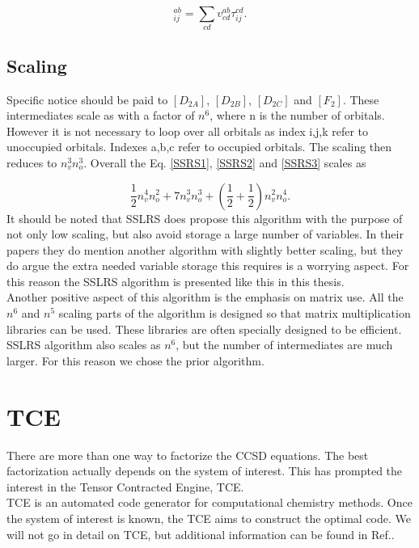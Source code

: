 \begin{equation}
[F_2]_{ij}^{ab} = \sum_{cd} v_{cd}^{ab} \tau_{ij}^{cd} .
\end{equation}

\subsection{Scaling}
Specific notice should be paid to $[D_{2A}]$, $[D_{2B}]$, $[D_{2C}]$ and $[F_{2}]$. These intermediates scale as with a factor of $n^6$, where n is the number of orbitals. However it is not necessary to loop over all orbitals as index i,j,k refer to unoccupied orbitals. Indexes a,b,c refer to occupied orbitals. The scaling then reduces to $n_v^3 n_o^3$. Overall the Eq. \eqref{SSRS1}, \eqref{SSRS2} and \eqref{SSRS3} scales as 

\begin{equation}
\frac{1}{2} n_v^4 n_o^2 + 7 n_v^3 n_o^3 + \left( \frac{1}{2} + \frac{1}{2} \right) n_v^2 n_o^4 . 
\end{equation} 
It should be noted that SSLRS does propose this algorithm with the purpose of not only low scaling, but also avoid storage a large number of variables. In their papers they do mention another algorithm with slightly better scaling, but they do argue the extra needed variable storage this requires is a worrying aspect. For this reason the SSLRS algorithm is presented like this in this thesis.\\

Another positive aspect of this algorithm is the emphasis on matrix use. All the $n^6$ and $n^5$ scaling parts of the algorithm is designed so that matrix multiplication libraries can be used. These libraries are often specially designed to be efficient. \\

SSLRS algorithm also scales as $n^6$, but the number of intermediates are much larger. For this reason we chose the prior algorithm.

\section{TCE}
There are more than one way to factorize the CCSD equations. The best factorization actually depends on the system of interest. This has prompted the interest in the Tensor Contracted Engine, TCE. \\

TCE is an automated code generator for computational chemistry methods. Once the system of interest is known, the TCE aims to construct the optimal code. We will not go in detail on TCE, but additional information can be found in Ref.\cite{tce_citation_numbah_10}. 





